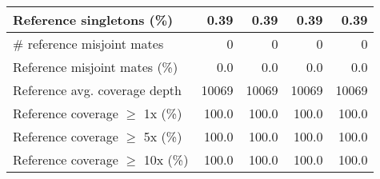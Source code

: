 \documentclass[12pt,a4paper]{article}
\begin{document}
\begin{table}[ht]
\begin{center}
\begin{tabular}{|l*{4}{|r}|}
Reference singletons (\%) & 0.39 & 0.39 & 0.39 & 0.39 \\ \hline
\# reference misjoint mates & 0 & 0 & 0 & 0 \\ \hline
Reference misjoint mates (\%) & 0.0 & 0.0 & 0.0 & 0.0 \\ \hline
Reference avg. coverage depth & 10069 & 10069 & 10069 & 10069 \\ \hline
Reference coverage $\geq$ 1x (\%) & 100.0 & 100.0 & 100.0 & 100.0 \\ \hline
Reference coverage $\geq$ 5x (\%) & 100.0 & 100.0 & 100.0 & 100.0 \\ \hline
Reference coverage $\geq$ 10x (\%) & 100.0 & 100.0 & 100.0 & 100.0 \\ \hline
\end{tabular}
\end{center}
\end{table}
\end{document}
